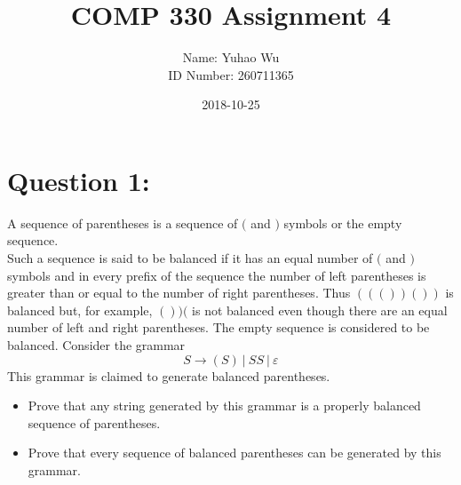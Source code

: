 \documentclass [9 pt]{article}
\theoremstyle{definition}
\begin{document}
\title{COMP 330 Assignment 4}
\date{2018-10-25}
\author{Name: Yuhao Wu\\
ID Number: 260711365
}
\maketitle

\section*{Question 1:}
A sequence of parentheses is a sequence of $($ and $)$ symbols or the empty sequence.\\
 Such a sequence is said to be balanced if it has an equal number of $($ and $)$ symbols and in every prefix of the sequence the number of left parentheses is greater than or equal to the number of right parentheses. Thus $((())())$ is balanced but, for example, $())($ is not balanced even though there are an equal number of left and right parentheses. The empty sequence is considered to be balanced.
 Consider the grammar
$$S \to (S)\ |\ SS\ |\ \varepsilon$$
This grammar is claimed to generate balanced parentheses.
\begin{itemize}
	\item Prove that any string generated by this grammar is a properly balanced sequence of parentheses.
	\item Prove that every sequence of balanced parentheses can be generated by this grammar.
\end{itemize}
\end{document}

